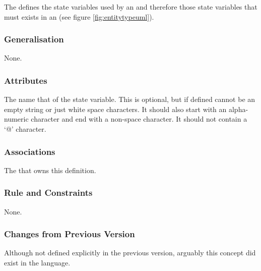 The  defines the state variables
used by an  and therefore those state variables
that must exists in an  (see figure
\ref{fig:entitytypeuml}).

\subsubsection{Generalisation}

None.

\subsubsection{Attributes}

\begin{attributes}
   The name that of the state variable. This
  is optional, but if defined cannot be an empty string or just white
  space characters. It should also start with an alpha-numeric
  character and  end with a non-space character. It should not contain
  a `@' character.
\end{attributes}


\subsubsection{Associations}

\begin{attributes}
   The
   that owns this definition.
\end{attributes}

\subsubsection{Rule and Constraints}

None.

\subsubsection{Changes from Previous Version}

Although not defined explicitly in the previous version, arguably this
concept did exist in the language.

